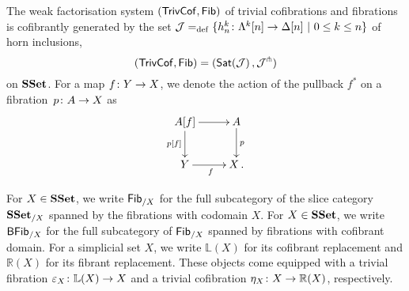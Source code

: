 \documentclass[reqno,10pt,a4paper,oneside,draft]{amsart}
\begin{document}
The weak factorisation system $(\mathsf{TrivCof}, \mathsf{Fib})$ of  trivial cofibrations and fibrations is cofibrantly 
generated by the set $\mathcal{J} =_{\operatorname{def}} \{ h^k_n  \colon \Lambda^k[n] \to \Delta[n]  \ | \ 0 \leq k \leq n \}$ of horn 
inclusions, \ie 
\[
(\mathsf{TrivCof}, \mathsf{Fib}) = ( \mathsf{Sat}(\mathcal{J}) \, , \mathcal{J}^\pitchfork)
\] 
on $\mathbf{SSet}$. For a map $f \colon Y \to X$, we denote the action of the pullback $f^*$ on a fibration~$p \colon A \to X$ as
\[
\xymatrix{
A[f] \ar[r] \ar[d]_{p[f]} & A \ar[d]^{p} \\
Y \ar[r]_f & X \, .}
\]


For $X \in \mathbf{SSet}$, we write $\mathsf{Fib}_{/X}$ for the full subcategory of the slice category $\mathbf{SSet}_{/X}$ spanned by the fibrations with codomain $X$. For $X \in \mathbf{SSet}$, we write $\mathsf{BFib}_{/X}$ for  the full subcategory of  $\mathsf{Fib}_{/X}$ spanned by fibrations with cofibrant domain. For a simplicial set $X$, we write $\mathbb{L}(X)$ for its cofibrant replacement and $\mathbb{R}(X)$ for its
fibrant replacement. These objects come equipped with a trivial fibration $\varepsilon_X \colon \mathbb{L}(X) \to X$ and a trivial cofibration $\eta_X \colon 
X \to \mathbb{R}(X)$, respectively.

\medskip
\end{document}
